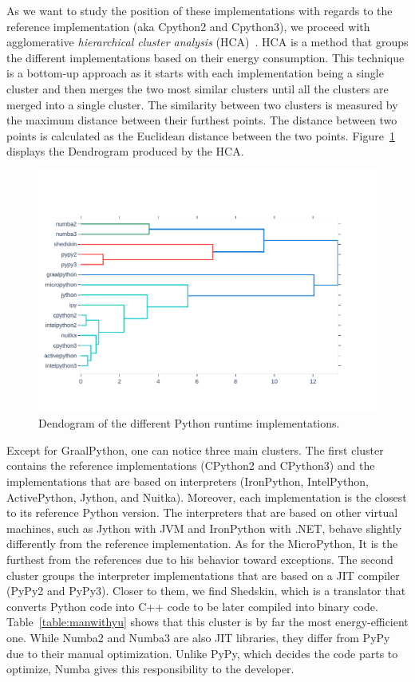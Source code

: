 As we want to study the position of these implementations with regards to the reference implementation (aka Cpython2 and Cpython3), we proceed with agglomerative \emph{hierarchical cluster analysis} (HCA)~\cite{johnson1967hierarchical}.
HCA is a method that groups the different implementations based on their energy consumption.
This technique is a bottom-up approach as it starts with each implementation being a single cluster and then merges the two most similar clusters until all the clusters are merged into a single cluster.
The similarity between two clusters is measured by the maximum distance between their furthest points.
The distance between two points is calculated as the Euclidean distance between the two points.
Figure~\ref{fig:dendogram} displays the Dendrogram produced by the HCA.

\begin{figure}[!htb]
      \centering
      \includegraphics[width=.8\linewidth]{imgs/dendogram_interpreters}
      \caption{Dendogram of the different Python runtime implementations.}
      \label{fig:dendogram}
\end{figure}

Except for GraalPython, one can notice three main clusters.
The first cluster contains the reference implementations (CPython2 and CPython3) and the implementations that are based on interpreters (IronPython, IntelPython, ActivePython, Jython, and Nuitka).
Moreover, each implementation is the closest to its reference Python version.
The interpreters that are based on other virtual machines, such as Jython with JVM and IronPython with .NET, behave slightly differently from the reference implementation.
As for the MicroPython, It is the furthest from the references due to his behavior toward exceptions.
The second cluster groups the interpreter implementations that are based on a JIT compiler (PyPy2 and PyPy3).
Closer to them, we find Shedskin, which is a translator that converts Python code into C++ code to be later compiled into binary code.
Table~\ref{table:manwithyu} shows that this cluster is by far the most energy-efficient one.
While Numba2 and Numba3 are also JIT libraries, they differ from PyPy due to their manual optimization.
Unlike PyPy, which decides the code parts to optimize, Numba gives this responsibility to the developer.
\bigskip

